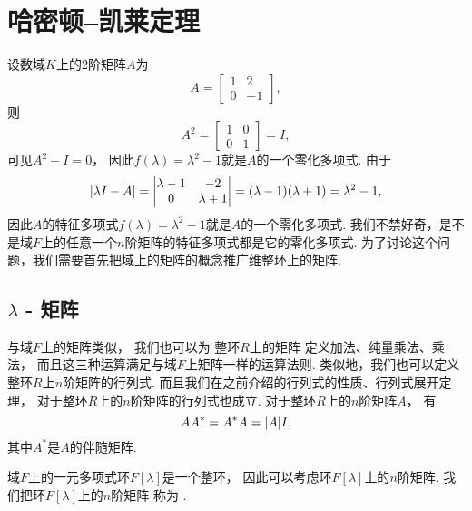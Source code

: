 \section{哈密顿--凯莱定理}
设数域\(K\)上的2阶矩阵\(A\)为\begin{equation*}
	A = \begin{bmatrix}
		1 & 2 \\
		0 & -1
	\end{bmatrix},
\end{equation*}
则\begin{equation*}
	A^2
	= \begin{bmatrix}
		1 & 0 \\
		0 & 1
	\end{bmatrix}
	= I,
\end{equation*}
可见\(A^2 - I = 0\)，
因此\(f(\lambda) = \lambda^2 - 1\)就是\(A\)的一个零化多项式.
由于\begin{equation*}
	\abs{\lambda I - A}
	= \begin{vmatrix}
		\lambda-1 & -2 \\
		0 & \lambda+1
	\end{vmatrix}
	= (\lambda-1)(\lambda+1)
	= \lambda^2-1,
\end{equation*}
因此\(A\)的特征多项式\(f(\lambda) = \lambda^2-1\)就是\(A\)的一个零化多项式.
我们不禁好奇，是不是域\(F\)上的任意一个\(n\)阶矩阵的特征多项式都是它的零化多项式.
为了讨论这个问题，我们需要首先把域上的矩阵的概念推广维整环上的矩阵.

\subsection{\texorpdfstring{$\lambda$}{\textlambda} - 矩阵}
与域\(F\)上的矩阵类似，
我们也可以为
整环\(R\)上的矩阵
定义加法、纯量乘法、乘法，
而且这三种运算满足与域\(F\)上矩阵一样的运算法则.
类似地，我们也可以定义整环\(R\)上\(n\)阶矩阵的行列式.
而且我们在之前介绍的行列式的性质、行列式展开定理，
对于整环\(R\)上的\(n\)阶矩阵的行列式也成立.
对于整环\(R\)上的\(n\)阶矩阵\(A\)，
有\begin{equation*}
	A A^* = A^* A = \abs{A} I,
\end{equation*}
其中\(A^*\)是\(A\)的伴随矩阵.

域\(F\)上的一元多项式环\(F[\lambda]\)是一个整环，
因此可以考虑环\(F[\lambda]\)上的\(n\)阶矩阵.
我们把环\(F[\lambda]\)上的\(n\)阶矩阵
称为 .

